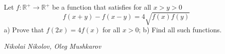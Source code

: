 Let $f:\mathbb{R}^+\to\mathbb{R}^+$ be a function that satisfies for all $x>y>0$
\[f(x+y)-f(x-y)=4\sqrt{f(x)f(y)}\]
a) Prove that $f(2x)=4f(x)$ for all $x>0$;
b) Find all such functions.

\textit{Nikolai Nikolov, Oleg Mushkarov }